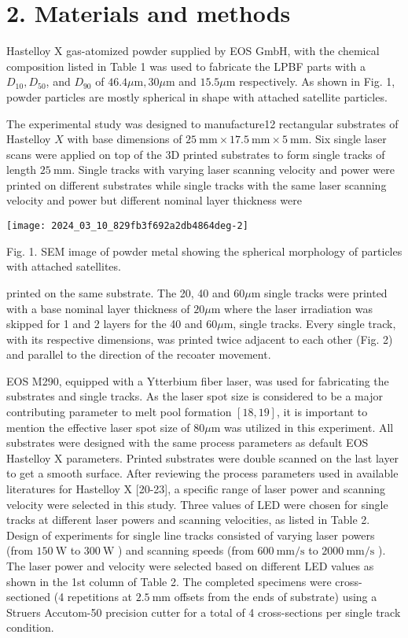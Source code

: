 \documentclass[10pt]{article}
\begin{document}
\section*{2. Materials and methods}
Hastelloy X gas-atomized powder supplied by EOS GmbH, with the chemical composition listed in Table 1 was used to fabricate the LPBF parts with a $D_{10}, D_{50}$, and $D_{90}$ of $46.4 \mu \mathrm{m}, 30 \mu \mathrm{m}$ and $15.5 \mu \mathrm{m}$ respectively. As shown in Fig. 1, powder particles are mostly spherical in shape with attached satellite particles.

The experimental study was designed to manufacture12 rectangular substrates of Hastelloy $X$ with base dimensions of $25 \mathrm{~mm} \times 17.5 \mathrm{~mm} \times 5 \mathrm{~mm}$. Six single laser scans were applied on top of the 3D printed substrates to form single tracks of length $25 \mathrm{~mm}$. Single tracks with varying laser scanning velocity and power were printed on different substrates while single tracks with the same laser scanning velocity and power but different nominal layer thickness were

\begin{center}
\texttt{[image: 2024\_03\_10\_829fb3f692a2db4864deg-2]}
\end{center}

Fig. 1. SEM image of powder metal showing the spherical morphology of particles with attached satellites.

printed on the same substrate. The 20, 40 and $60 \mu \mathrm{m}$ single tracks were printed with a base nominal layer thickness of $20 \mu \mathrm{m}$ where the laser irradiation was skipped for 1 and 2 layers for the 40 and $60 \mu \mathrm{m}$, single tracks. Every single track, with its respective dimensions, was printed twice adjacent to each other (Fig. 2) and parallel to the direction of the recoater movement.

EOS M290, equipped with a Ytterbium fiber laser, was used for fabricating the substrates and single tracks. As the laser spot size is considered to be a major contributing parameter to melt pool formation $[18,19]$, it is important to mention the effective laser spot size of $80 \mu \mathrm{m}$ was utilized in this experiment. All substrates were designed with the same process parameters as default EOS Hastelloy X parameters. Printed substrates were double scanned on the last layer to get a smooth surface. After reviewing the process parameters used in available literatures for Hastelloy X [20-23], a specific range of laser power and scanning velocity were selected in this study. Three values of LED were chosen for single tracks at different laser powers and scanning velocities, as listed in Table 2. Design of experiments for single line tracks consisted of varying laser powers (from $150 \mathrm{~W}$ to $300 \mathrm{~W}$ ) and scanning speeds (from $600 \mathrm{~mm} / \mathrm{s}$ to $2000 \mathrm{~mm} / \mathrm{s}$ ). The laser power and velocity were selected based on different LED values as shown in the 1st column of Table 2. The completed specimens were cross-sectioned (4 repetitions at $2.5 \mathrm{~mm}$ offsets from the ends of substrate) using a Struers Accutom-50 precision cutter for a total of 4 cross-sections per single track condition.
\end{document}

